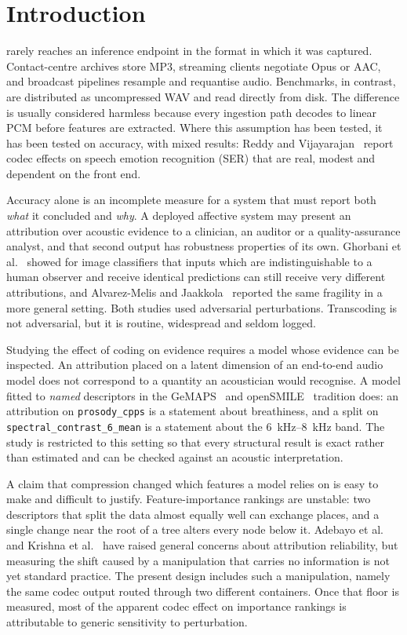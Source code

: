 \documentclass[lettersize,journal]{IEEEtran}
\newcommand{\ttf}[1]{\texttt{\footnotesize #1}}
\begin{document}
\section{Introduction}
 rarely reaches an inference endpoint in the format in
which it was captured. Contact-centre archives store MP3, streaming clients
negotiate Opus or AAC, and broadcast pipelines resample and requantise audio.
Benchmarks, in contrast, are distributed as uncompressed WAV and read directly
from disk. The difference is usually considered harmless because every
ingestion path decodes to linear PCM before features are extracted. Where this
assumption has been tested, it has been tested on accuracy, with mixed results:
Reddy and Vijayarajan~\cite{reddy2020compression} report codec effects on
speech emotion recognition (SER) that are real, modest and dependent on the
front end.

Accuracy alone is an incomplete measure for a system that must report both
\emph{what} it concluded and \emph{why}. A deployed affective system may present
an attribution over acoustic evidence to a clinician, an auditor or a
quality-assurance analyst, and that second output has robustness properties of
its own. Ghorbani et al.~\cite{ghorbani2019fragile} showed for image
classifiers that inputs which are indistinguishable to a human observer and
receive identical predictions can still receive very different attributions,
and Alvarez-Melis and Jaakkola~\cite{alvarez2018robustness} reported the same
fragility in a more general setting. Both studies used adversarial
perturbations. Transcoding is not adversarial, but it is routine, widespread
and seldom logged.

Studying the effect of coding on evidence requires a model whose evidence can be
inspected. An attribution placed on a latent dimension of an end-to-end audio
model does not correspond to a quantity an acoustician would recognise. A model
fitted to \emph{named} descriptors in the GeMAPS~\cite{eyben2016gemaps} and
openSMILE~\cite{eyben2010opensmile} tradition does: an attribution on
\ttf{prosody\_cpps} is a statement about breathiness, and a split on
\ttf{spectral\_contrast\_6\_mean} is a statement about the
\SIrange{6}{8}{\kilo\hertz} band. The study is restricted to this setting so
that every structural result is exact rather than estimated and can be checked
against an acoustic interpretation.

A claim that compression changed which features a model relies on is easy to
make and difficult to justify. Feature-importance rankings are unstable: two
descriptors that split the data almost equally well can exchange places, and a
single change near the root of a tree alters every node below it. Adebayo et
al.~\cite{adebayo2018sanity} and Krishna et al.~\cite{krishna2022disagreement}
have raised general concerns about attribution reliability, but measuring the
shift caused by a manipulation that carries no information is not yet standard
practice. The present design includes such a manipulation, namely the same
codec output routed through two different containers. Once that floor is
measured, most of the apparent codec effect on importance rankings is
attributable to generic sensitivity to perturbation.
\end{document}
